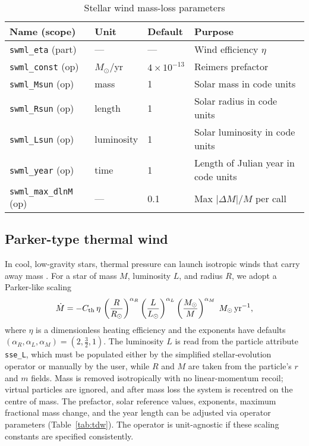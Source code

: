 \documentclass[11pt]{article}
\begin{document}
\begin{table}[h]
\centering\footnotesize
\caption{Stellar wind mass-loss parameters}
\label{tab:swml}
\begin{tabular}{@{}llll@{}}
\toprule
Name (scope) & Unit & Default & Purpose \\
\midrule
\texttt{swml\_eta} (part) & — & — & Wind efficiency $\eta$\\
\texttt{swml\_const} (op) & $M_\odot$/yr & $4\times10^{-13}$ & Reimers prefactor\\
\texttt{swml\_Msun}  (op) & mass & 1 & Solar mass in code units\\
\texttt{swml\_Rsun}  (op) & length & 1 & Solar radius in code units\\
\texttt{swml\_Lsun}  (op) & luminosity & 1 & Solar luminosity in code units\\
\texttt{swml\_year}  (op) & time & 1 & Length of Julian year in code units\\
\texttt{swml\_max\_dlnM} (op) & — & 0.1 & Max $|\Delta M|/M$ per call\\
\bottomrule
\end{tabular}
\end{table}

\subsection{Parker-type thermal wind}
\label{sec:tdw}

In cool, low-gravity stars, thermal pressure can launch isotropic winds that carry away mass \citep{parker}. For a star
of mass $M$, luminosity $L$, and radius $R$, we adopt a Parker-like scaling
\[
\dot M = -C_{\rm th}\,\eta\,\left(\frac{R}{R_\odot}\right)^{\alpha_R}
                   \left(\frac{L}{L_\odot}\right)^{\alpha_L}
                   \left(\frac{M_\odot}{M}\right)^{\alpha_M}
\;M_\odot\,\mathrm{yr}^{-1},
\]
where $\eta$ is a dimensionless heating efficiency and the exponents have
defaults $(\alpha_R,\alpha_L,\alpha_M)=(2,\tfrac{3}{2},1)$.  The luminosity
$L$ is read from the particle attribute \texttt{sse\_L}, which must be
populated either by the simplified stellar‑evolution operator or manually by
the user, while $R$ and $M$ are taken from the particle's $r$ and $m$ fields.
Mass is removed isotropically
with no linear-momentum recoil; virtual particles are ignored, and after mass
loss the system is recentred on the centre of mass.  The prefactor, solar
reference values, exponents, maximum fractional mass change, and the year
length can be adjusted via operator parameters (Table~\ref{tab:tdw}). The
operator is unit-agnostic if these scaling constants are specified
consistently.
\end{document}
